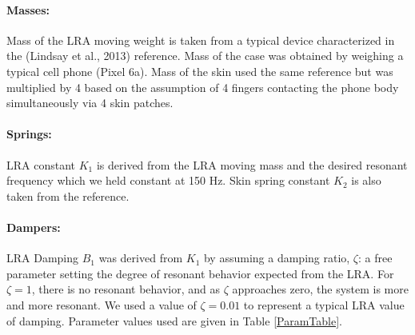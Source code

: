 \documentclass[letterpaper,11pt]{article}
\begin{document}
\paragraph{Masses:}
Mass of the LRA moving weight is taken from a typical device characterized in the (Lindsay et al., 2013) reference.   Mass of the case was
obtained by weighing a typical cell phone (Pixel 6a).   Mass of the skin used the same reference but was multiplied by 4 based on the assumption of
4 fingers contacting the phone body simultaneously via 4 skin patches.

\paragraph{Springs:}
LRA constant $K_1$ is derived from the LRA moving mass and the desired resonant frequency
which we held constant at 150 Hz.  Skin spring constant
$K_2$ is also  taken from the reference.

\paragraph{Dampers:}
LRA Damping $B_1$ was derived from $K_1$ by assuming a damping ratio, $\zeta$:
a free parameter setting the degree of resonant behavior expected from the LRA.
For $\zeta=1$, there is no resonant behavior, and as $\zeta$ approaches zero, the system is more and more resonant.  We used a value of $\zeta=0.01$
to represent a typical LRA value of damping.  Parameter values used are given
in Table \ref{ParamTable}.
\end{document}
